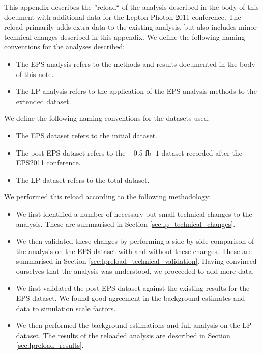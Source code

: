 
This appendix describes the ''reload`` of the analysis described in the body
of this document with additional data for the Lepton Photon 2011 conference.
The reload primarily adds extra data to the existing analysis, but also 
includes minor technical changes described in this appendix.
We define the following naming conventions for the analyses described:

\begin{itemize}
    \item The EPS analysis refers to the methods and results documented in the body of this note.
    \item The LP analysis refers to the application of the EPS analysis methods to the extended dataset.
\end{itemize}

We define the following naming conventions for the datasets used:

\begin{itemize}
    \item The EPS dataset refers to the initial \intlumi dataset.
    \item The post-EPS dataset refers to the ~ 0.5 fb$^-1$ dataset recorded after the EPS2011 conference.
    \item The LP dataset refers to the total \lpintlumi dataset.
\end{itemize}

We performed this reload according to the following methodology:

\begin{itemize}
    \item We first identified a number of necessary but small technical changes to the analysis.  
These are summarised in Section \ref{sec:lp_technical_changes}.
    \item We then validated these changes by performing a side by side comparison of 
the analysis on the EPS dataset with and without these changes.
These are summarised in Section \ref{sec:lpreload_technical_validation}.
Having convinced ourselves that the analysis was understood, we proceeded to add more data.
    \item We first validated the post-EPS dataset against the existing results for the EPS dataset.
We found good agreement in the background estimates and data to simulation scale factors.
    \item We then performed the background estimations and full analysis on the LP dataset.
The results of the reloaded analysis are described in Section \ref{sec:lpreload_results}.
\end{itemize}

